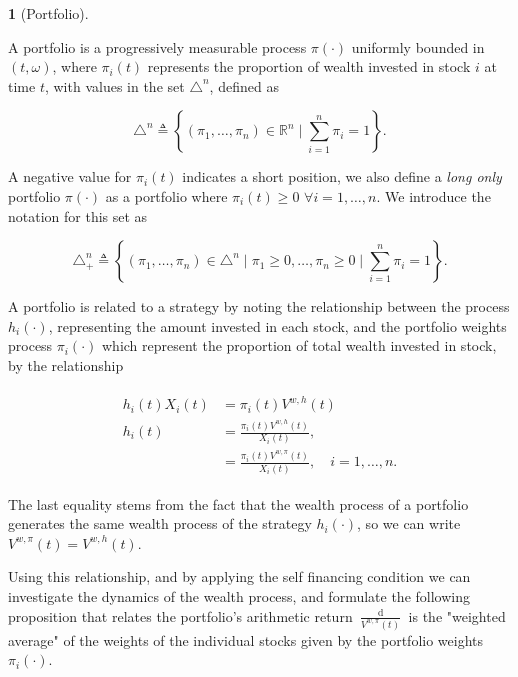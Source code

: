 \documentclass[british]{amsart} \usepackage{lmodern}
\numberwithin{equation}{section} \numberwithin{figure}{section}
\theoremstyle{plain} \newtheorem{thm}{\protect\theoremname}[section]
\theoremstyle{definition} \newtheorem{defn}[thm]{\protect\definitionname}
\theoremstyle{plain} \newtheorem{assumption}[thm]{\protect\assumptionname}
\theoremstyle{plain} \newtheorem{lem}[thm]{\protect\lemmaname}
\theoremstyle{plain} \newtheorem{prop}[thm]{\protect\propositionname}
\theoremstyle{remark} \newtheorem{rem}[thm]{\protect\remarkname}
\theoremstyle{plain} \newtheorem{cor}[thm]{\protect\corollaryname}
\renewcommand{\d}[1]{\mathop{\mathrm{d}{#1}}}
\newcommand{\defeq}{\mathop{\triangleq}} \newcommand{\almostsurely}{\text{a.s.}}
\newcommand{\rangei}{i=1,\dots,n} \newcommand{\measure}{\mathbb{P}}
\newcommand{\V}{V^{w,\pi}}
\begin{document}
\begin{defn} [Portfolio]
  \label{def:portfolio}

  A portfolio is a progressively measurable process $\pi(\cdot)$ uniformly
  bounded in $(t,\omega)$, where $\pi_{i}(t)$ represents the proportion of wealth
  invested in stock $i$ at time $t$, with values in the set $\triangle^{n}$,
  defined as 

  \begin{equation*}
    \triangle^{n} \defeq 
    \left\{
          (\pi_{1}, \dots, \pi_{n}) \in \mathbb{R}^{n} 
          \mid
          \sum_{i=1}^{n} \pi_{i} = 1
    \right\}.
  \end{equation*}

  A negative value for $\pi_{i}(t)$ indicates a short position, we also define a
  \textit{long only} portfolio $\pi(\cdot)$ as a portfolio where $\pi_{i}(t) \ge
  0$ $\forall \rangei$. We introduce the notation for this set as

  \begin{equation*}
    \triangle_{+}^{n} \defeq 
    \left\{
          (\pi_{1}, \dots, \pi_{n}) \in \triangle^{n} 
          \mid
          \pi_{1} \ge 0, \dots, \pi_{n} \ge 0
          \mid
          \sum_{i=1}^{n} \pi_{i} = 1
    \right\}.
  \end{equation*}

\end{defn}

A portfolio is related to a strategy by noting the relationship between the
process $h_{i}(\cdot)$, representing the amount invested in each stock, and the
portfolio weights process $\pi_{i}(\cdot)$ which represent the proportion of
total wealth invested in stock, by the relationship

\begin{gather}
  \begin{split}
    \label{eq:wealthinvestedbyportfolio}
    h_i(t)X_{i}(t) &= \pi_{i}(t)V^{w,h}(t) \\
    h_i(t) &= \frac{\pi_{i}(t)V^{w,h}(t)}{X_{i}(t)}, \\
    &= \frac{\pi_{i}(t)V^{w,\pi}(t)}{X_{i}(t)},
    \quad \rangei.
  \end{split}
\end{gather}

The last equality stems from the fact that the wealth process of a portfolio
generates the same wealth process of the strategy $h_{i}(\cdot)$, so we can 
write $V^{w,\pi}(t)=V^{w,h}(t)$.

Using this relationship, and by applying the self financing condition we can
investigate the dynamics of the wealth process, and formulate the following
proposition that relates the portfolio's arithmetic return
$\frac{\d{\V(t)}}{\V(t)}$ is the "weighted average" of the weights of the
individual stocks given by the portfolio weights $\pi_{i}(\cdot)$.
\end{document}
